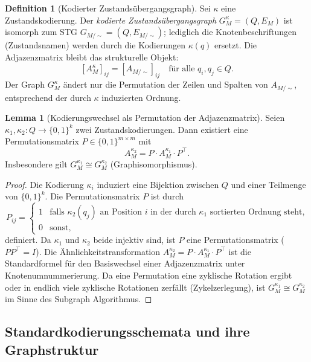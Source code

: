 ﻿\documentclass[a4paper,12pt]{article}
\theoremstyle{definition}
\newtheorem{definition}{Definition}
\newtheorem{lemma}{Lemma}
\begin{document}
\begin{definition}[Kodierter Zustandsübergangsgraph]\label{def:kodierterstg}
  Sei $\kappa$ eine Zustandskodierung. Der \emph{kodierte Zustandsübergangsgraph}
  $G_M^\kappa = (Q, E_M)$ ist isomorph zum STG $G_{M/{\sim}} = (Q, E_{M/{\sim}})$;
  lediglich die Knotenbeschriftungen (Zustandsnamen) werden durch die Kodierungen
  $\kappa(q)$ ersetzt. Die Adjazenzmatrix bleibt das strukturelle Objekt:
  \[
    [A_M^\kappa]_{ij} = [A_{M/{\sim}}]_{ij}
    \quad \text{für alle } q_i, q_j \in Q.
  \]
  Der Graph $G_M^\kappa$ ändert nur die Permutation der Zeilen und Spalten von
  $A_{M/{\sim}}$, entsprechend der durch $\kappa$ induzierten Ordnung.
\end{definition}

\begin{lemma}[Kodierungswechsel als Permutation der Adjazenzmatrix]\label{lemma:kodperm}
  Seien $\kappa_1, \kappa_2: Q \to \{0,1\}^k$ zwei Zustandskodierungen. Dann existiert
  eine Permutationsmatrix $P \in \{0,1\}^{m \times m}$ mit
  \[
    A_M^{\kappa_2} = P \cdot A_M^{\kappa_1} \cdot P^\top.
  \]
  Insbesondere gilt $G_M^{\kappa_1} \cong G_M^{\kappa_2}$ (Graphisomorphismus).
\end{lemma}

\begin{proof}
  Die Kodierung $\kappa_i$ induziert eine Bijektion zwischen $Q$ und einer Teilmenge
  von $\{0,1\}^k$. Die Permutationsmatrix $P$ ist durch
  \[
    P_{ij} = \begin{cases} 1 & \text{falls } \kappa_2(q_j) \text{ an Position } i
                                \text{ in der durch } \kappa_1 \text{ sortierten Ordnung steht,} \\
                           0 & \text{sonst,} \end{cases}
  \]
  definiert. Da $\kappa_1$ und $\kappa_2$ beide injektiv sind, ist $P$ eine
  Permutationsmatrix ($P P^\top = I$). Die Ähnlichkeitstransformation
  $A_M^{\kappa_2} = P \cdot A_M^{\kappa_1} \cdot P^\top$ ist die Standardformel für
  den Basiswechsel einer Adjazenzmatrix unter Knotenumnummerierung. Da eine Permutation
  eine zyklische Rotation ergibt oder in endlich viele zyklische Rotationen zerfällt
  (Zykelzerlegung), ist $G_M^{\kappa_1} \cong G_M^{\kappa_2}$ im Sinne des
  Subgraph Algorithmus.
\end{proof}

\subsection{Standardkodierungsschemata und ihre Graphstruktur}
\end{document}
